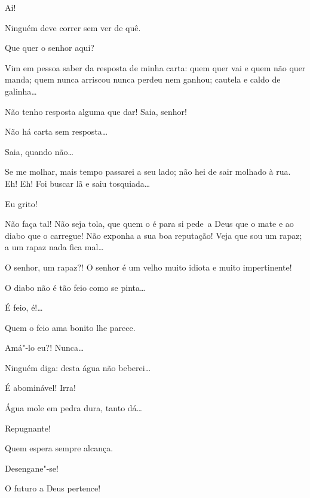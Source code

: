 

  Ai!

   Ninguém deve correr sem ver
de quê.

  Que quer o senhor aqui?

  Vim em pessoa saber da resposta de minha carta: quem quer vai e
quem não quer manda; quem nunca arriscou nunca perdeu nem ganhou; cautela e
caldo de galinha\ldots

  Não tenho resposta alguma que dar!
Saia, senhor!

  Não há carta sem resposta\ldots

  Saia,
quando não\ldots

   Se me molhar, mais tempo passarei a seu
lado; não hei de sair molhado à rua. Eh! Eh! Foi buscar lã e saiu
tosquiada\ldots

  Eu grito!

  Não faça tal! Não seja tola, que quem o é para si \mbox{pede a} Deus
que o mate e ao diabo que o carregue! Não exponha a sua boa reputação! Veja que
sou um rapaz; a um rapaz nada fica mal\ldots

  O senhor, um rapaz?! O senhor é um velho muito idiota e muito
impertinente!

  O diabo não é tão feio como se pinta\ldots

  É feio, é!\ldots

  Quem o feio ama bonito lhe parece.

  Amá"-lo eu?! Nunca\ldots

  Ninguém diga: desta água não beberei\ldots

  É abominável! Irra!

  Água mole em pedra dura, tanto dá\ldots

  Repugnante!

  Quem espera sempre alcança.

  Desengane"-se!

  O futuro a Deus pertence!

